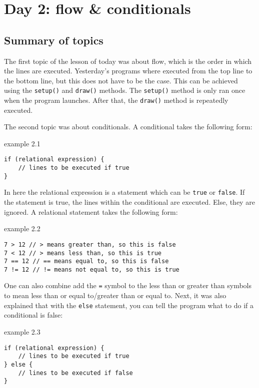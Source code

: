 \chapter{Day 2: flow \& conditionals}

\section{Summary of topics}
The first topic of the lesson of today was about flow, which is the order in which the lines are executed. Yesterday's programs where executed from the top line to the bottom line, but this does not have to be the case. This can be achieved using the \texttt{setup()} and \texttt{draw()} methods. The \texttt{setup()} method is only ran once when the program launches. After that, the \texttt{draw()} method is repeatedly executed.

The second topic was about conditionals. A conditional takes the following form:

\begin{codebox}{example 2.1}
    \begin{lstlisting}
if (relational expression) {
    // lines to be executed if true
}
    \end{lstlisting}
\end{codebox}

In here the relational expression is a statement which can be \texttt{true} or \texttt{false}. If the statement is true, the lines within the conditional are executed. Else, they are ignored. A relational statement takes the following form:

\begin{codebox}{example 2.2}
    \begin{lstlisting}
7 > 12 // > means greater than, so this is false
7 < 12 // > means less than, so this is true
7 == 12 // == means equal to, so this is false
7 != 12 // != means not equal to, so this is true
    \end{lstlisting}
\end{codebox}

One can also combine add the \texttt{=} symbol to the less than or greater than symbols to mean less than or equal to/greater than or equal to. Next, it was also explained that with the \texttt{else} statement, you can tell the program what to do if a conditional is false:

\begin{codebox}{example 2.3}
    \begin{lstlisting}
if (relational expression) {
    // lines to be executed if true
} else {
    // lines to be executed if false
}
    \end{lstlisting}
\end{codebox}

